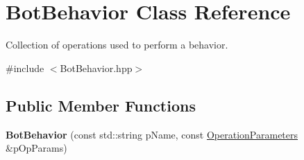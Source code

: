 \hypertarget{classBotBehavior}{\section{Bot\-Behavior Class Reference}
\label{classBotBehavior}
}


Collection of operations used to perform a behavior.  




{\ttfamily \#include $<$Bot\-Behavior.\-hpp$>$}

\subsection*{Public Member Functions}
\begin{DoxyCompactItemize}
\item 
\hypertarget{classBotBehavior_a07b5a5aa8e4318002515477f1d1405c5}{{\bfseries Bot\-Behavior} (const std\-::string p\-Name, const \hyperlink{classOperationParameters}{Operation\-Parameters} \&p\-Op\-Params)}\label{classBotBehavior_a07b5a5aa8e4318002515477f1d1405c5}


\end{DoxyCompactItemize}
